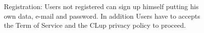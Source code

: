 \begin{figure}[H]
  \caption{Registration: Users not registered can sign up himself putting his own data, e-mail and password. In addition Users have to accepts the Term of Service and the CLup privacy policy to proceed.}
\end{figure}
